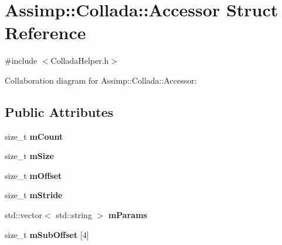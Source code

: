\hypertarget{struct_assimp_1_1_collada_1_1_accessor}{\section{Assimp\+:\+:Collada\+:\+:Accessor Struct Reference}
\label{struct_assimp_1_1_collada_1_1_accessor}
}


{\ttfamily \#include $<$Collada\+Helper.\+h$>$}



Collaboration diagram for Assimp\+:\+:Collada\+:\+:Accessor\+:
\subsection*{Public Attributes}
\begin{DoxyCompactItemize}
\item 
\hypertarget{struct_assimp_1_1_collada_1_1_accessor_a81aa0d3dafbb72064d16285ec55c24db}{size\+\_\+t {\bfseries m\+Count}}\label{struct_assimp_1_1_collada_1_1_accessor_a81aa0d3dafbb72064d16285ec55c24db}

\item 
\hypertarget{struct_assimp_1_1_collada_1_1_accessor_a1ede92700ed18334220a5d5ff51d4df5}{size\+\_\+t {\bfseries m\+Size}}\label{struct_assimp_1_1_collada_1_1_accessor_a1ede92700ed18334220a5d5ff51d4df5}

\item 
\hypertarget{struct_assimp_1_1_collada_1_1_accessor_a8739c6decf10d4a7d2d0f175b440f8c6}{size\+\_\+t {\bfseries m\+Offset}}\label{struct_assimp_1_1_collada_1_1_accessor_a8739c6decf10d4a7d2d0f175b440f8c6}

\item 
\hypertarget{struct_assimp_1_1_collada_1_1_accessor_a729ef477bc8329a3fa6e8fce804e8070}{size\+\_\+t {\bfseries m\+Stride}}\label{struct_assimp_1_1_collada_1_1_accessor_a729ef477bc8329a3fa6e8fce804e8070}

\item 
\hypertarget{struct_assimp_1_1_collada_1_1_accessor_aa7fb093433e1a56e3ea85cb53f88d1aa}{std\+::vector$<$ std\+::string $>$ {\bfseries m\+Params}}\label{struct_assimp_1_1_collada_1_1_accessor_aa7fb093433e1a56e3ea85cb53f88d1aa}

\item 
\hypertarget{struct_assimp_1_1_collada_1_1_accessor_a30ea205b1a86a51f63d83a346ffb9e50}{size\+\_\+t {\bfseries m\+Sub\+Offset} \mbox{[}4\mbox{]}}\label{struct_assimp_1_1_collada_1_1_accessor_a30ea205b1a86a51f63d83a346ffb9e50}


\end{DoxyCompactItemize}
